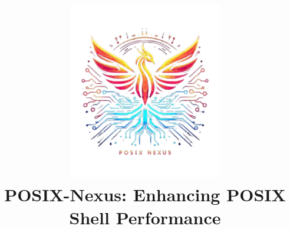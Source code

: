 \pgfplotsset{compat=1.18}
\titleformat{\section}[block]{\Large\bfseries}{\thesection}{1em}{}
\titleformat{\subsection}[block]{\large\bfseries}{\thesubsection}{1em}{}
\titleformat{\subsubsection}[block]{\normalsize\bfseries}{\thesubsubsection}{1em}{}
\fancyhf{}
\fancyhead[R]{\thepage}
\renewcommand{\headrulewidth}{0.4pt}
\renewcommand{\footrulewidth}{0.4pt}
\pagestyle{fancy}
\title{
    \includegraphics[width=0.5\textwidth]{images/posix-nexus-icon.png}\\[1cm]
    \textbf{POSIX-Nexus: Enhancing POSIX Shell Performance}
}


